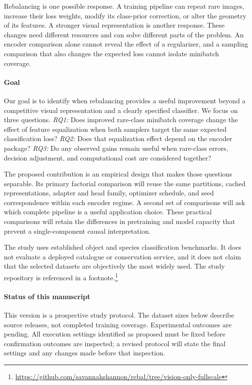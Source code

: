 \documentclass[conference]{IEEEtran}
\begin{document}
Rebalancing is one possible response. A training pipeline can repeat rare images, increase their loss weights, modify its class-prior correction, or alter the geometry of its features. A stronger visual representation is another response. These changes need different resources and can solve different parts of the problem. An encoder comparison alone cannot reveal the effect of a regularizer, and a sampling comparison that also changes the expected loss cannot isolate minibatch coverage.

\paragraph{Goal} Our goal is to identify when rebalancing provides a useful improvement beyond a competitive visual representation and a clearly specified classifier. We focus on three questions. \emph{RQ1:} Does improved rare-class minibatch coverage change the effect of feature equalization when both samplers target the same expected classification loss? \emph{RQ2:} Does that equalization effect depend on the encoder package? \emph{RQ3:} Do any observed gains remain useful when rare-class errors, decision adjustment, and computational cost are considered together?

The proposed contribution is an empirical design that makes those questions separable. Its primary factorial comparison will reuse the same partitions, cached representations, adapter and head family, optimizer schedule, and seed correspondence within each encoder regime. A second set of comparisons will ask which complete pipeline is a useful application choice. These practical comparisons will retain the differences in pretraining and model capacity that prevent a single-component causal interpretation.

The study uses established object and species classification benchmarks. It does not evaluate a deployed catalogue or conservation service, and it does not claim that the selected datasets are objectively the most widely used. The study repository is referenced in a footnote.\footnote{\url{https://github.com/savannahshannon/rebal/tree/vision-only-fullscale}}

\paragraph{Status of this manuscript} This version is a prospective study protocol. The dataset sizes below describe source releases, not completed training coverage. Experimental outcomes are pending. All execution settings identified as proposed must be fixed before confirmation outcomes are inspected; a revised protocol will state the final settings and any changes made before that inspection.
\end{document}
